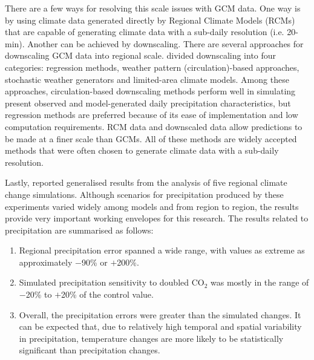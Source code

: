 There are a few ways for resolving this scale issues with GCM data. One way is
by using climate data generated directly by Regional Climate Models (RCMs) that
are capable of generating climate data with a sub-daily resolution (i.e.
20-min). Another can be achieved by downscaling. There are several approaches
for downscaling GCM data into regional scale. \citet{wilby1997-530} divided
downscaling into four categories: regression methods, weather pattern
(circulation)-based approaches, stochastic weather generators and limited-area
climate models. Among these approaches, circulation-based downscaling methods
perform well in simulating present observed and model-generated daily
precipitation characteristics, but regression methods are preferred because of
its ease of implementation and low computation requirements. RCM data and
downscaled data allow predictions to be made at a finer scale than GCMs. All of
these methods are widely accepted methods that were often chosen to generate
climate data with a sub-daily resolution.

Lastly, \citet{ipcc2001-1032} reported generalised results from the analysis of
five regional climate change simulations. Although scenarios for precipitation
produced by these experiments varied widely among models and from region to
region, the results provide very important working envelopes for this research.
The results related to precipitation are summarised as follows:
\begin{enumerate}
  \item Regional precipitation error spanned a wide range, with values as
extreme as approximately $-$90\% or $+$200\%.
  \item Simulated precipitation sensitivity to doubled CO$_2$ was mostly
in the range of $-$20\% to $+$20\% of the control value.
  \item Overall, the precipitation errors were greater than the simulated
changes. It can be expected that, due to relatively high temporal and spatial
variability in precipitation, temperature changes are more likely to be
statistically significant than precipitation changes.
\end{enumerate}
